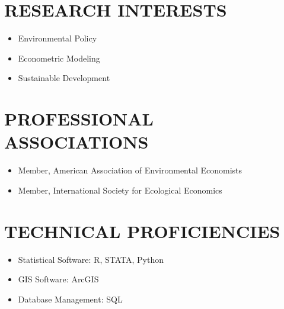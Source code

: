 \documentclass[9pt,margin]{res}
\begin{document}
\begin{resume}
    \noindent\hrulefill %
\section{RESEARCH INTERESTS}
    \vspace{1em}
    \begin{itemize}[label={--}]
        \item Environmental Policy
        \item Econometric Modeling
        \item Sustainable Development
    \end{itemize}

    \noindent\hrulefill %
\section{PROFESSIONAL ASSOCIATIONS}
    \vspace{1em}
    \begin{itemize}[label={--}]
        \item Member, American Association of Environmental Economists
        \item Member, International Society for Ecological Economics
    \end{itemize}
    
\newpage
\section{TECHNICAL PROFICIENCIES}
    \vspace{1em}
    \begin{itemize}[label={--}]
        \item Statistical Software: R, STATA, Python
        \item GIS Software: ArcGIS
        \item Database Management: SQL
    \end{itemize}
    

\end{resume}
\end{document}
